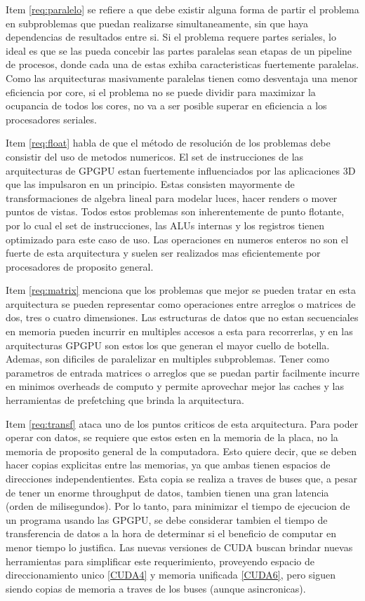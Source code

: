 Item \ref{req:paralelo} se refiere a que debe existir alguna forma de partir el problema
en subproblemas que puedan realizarse simultaneamente, sin que haya dependencias de
resultados entre si. Si el problema requere partes seriales, lo ideal es que se las
pueda concebir las partes paralelas sean etapas de un pipeline de procesos, donde
cada una de estas exhiba caracteristicas fuertemente paralelas. Como las arquitecturas
masivamente paralelas tienen como desventaja una menor eficiencia por core, si el
problema no se puede dividir para maximizar la ocupancia de todos los cores, no
va a ser posible superar en eficiencia a los procesadores seriales.

Item \ref{req:float} habla de que el m\'etodo de resoluci\'on de los problemas debe
consistir del uso de metodos numericos. El set de instrucciones de las arquitecturas
de GPGPU estan fuertemente influenciados por las aplicaciones 3D que las impulsaron
en un principio. Estas consisten mayormente de transformaciones de algebra lineal
para modelar luces, hacer renders o mover puntos de vistas. Todos estos problemas
son inherentemente de punto flotante, por lo cual el set de instrucciones, las ALUs
internas y los registros tienen optimizado para este caso de uso. Las operaciones
en numeros enteros no son el fuerte de esta arquitectura y suelen ser realizados
mas eficientemente por procesadores de proposito general.

Item \ref{req:matrix} menciona que los problemas que mejor se pueden tratar en esta
arquitectura se pueden representar como operaciones entre arreglos o matrices de
dos, tres o cuatro dimensiones. Las estructuras de datos que no estan secuenciales
en memoria pueden incurrir en multiples accesos a esta para recorrerlas, y en las
arquitecturas GPGPU son estos los que generan el mayor cuello de botella. Ademas,
son dificiles de paralelizar en multiples subproblemas. Tener como parametros de
entrada matrices o arreglos que se puedan partir facilmente incurre en minimos
overheads de computo y permite aprovechar mejor las caches y las herramientas de
prefetching que brinda la arquitectura.

Item \ref{req:transf} ataca uno de los puntos criticos de esta arquitectura. Para poder
operar con datos, se requiere que estos esten en la memoria de la placa, no la memoria
de proposito general de la computadora. Esto quiere decir, que se deben hacer copias
explicitas entre las memorias, ya que ambas tienen espacios de direcciones independentientes.
Esta copia se realiza a traves de buses que, a pesar de tener un enorme throughput de
datos, tambien tienen una gran latencia (orden de milisegundos). Por lo tanto, para minimizar
el tiempo de ejecucion de un programa usando las GPGPU, se debe considerar tambien el
tiempo de transferencia de datos a la hora de determinar si el beneficio de computar en
menor tiempo lo justifica. Las nuevas versiones de CUDA buscan brindar nuevas herramientas
para simplificar este requerimiento, proveyendo espacio de direccionamiento unico \ref{CUDA4} y
memoria unificada \ref{CUDA6}, pero siguen siendo copias de memoria a traves de los
buses (aunque asincronicas).

